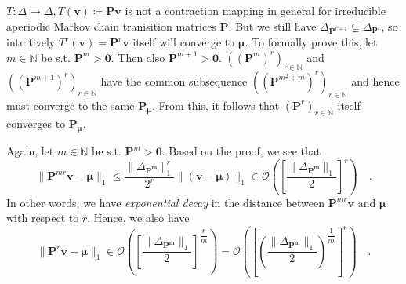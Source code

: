 \documentclass[../../main.tex]{subfiles}
\begin{document}
\begin{remark}
    $T: \Delta \to \Delta, T(\bm{v}) \coloneqq \bm{Pv}$ is not a contraction mapping in general for irreducible aperiodic Markov chain tranisition matrices $\bm{P}$. But we still have $\Delta_{\bm{P}^{r+1}} \subsetneq \Delta_{\bm{P}^{r}}$, so intuitively $T^{r}(\bm{v}) = \bm{P}^r\bm{v}$ itself will converge to $\bm{\mu}$. To formally prove this, let $m \in \mathbb{N}$ be s.t. $\bm{P}^m > \bm{0}$. Then also $\bm{P}^{m + 1} > \bm{0}$. $((\bm{P}^m)^r)_{r \in \mathbb{N}}$ and $((\bm{P}^{m + 1})^r)_{r \in \mathbb{N}}$ have the common subsequence $((\bm{P}^{m^2 + m})^r)_{r \in \mathbb{N}}$ and hence must converge to the same $\bm{P_\mu}$. From this, it follows that $(\bm{P}^r)_{r \in \mathbb{N}}$ itself converges to $\bm{P_\mu}$.
\end{remark}

\begin{remark}
    Again, let $m \in \mathbb{N}$ be s.t. $\bm{P}^m > \bm{0}$. Based on the proof, we see that
    \[
        \| \bm{P}^{mr} \bm{v} - \bm{\mu} \|_1 \leq \dfrac{\|\Delta_{\bm{P^m}}\|_1^r}{2^r} \| (\bm{v} - \bm{\mu}) \|_1 \in \mathcal{O} \left( \left[ \frac{\|\Delta_{\bm{P^m}}\|_1}{2} \right] ^r \right) \quad .
    \]
    In other words, we have \emph{exponential decay} in the distance between $\bm{P}^{mr} \bm{v}$ and $\bm{\mu}$ with respect to $r$. Hence, we also have
    \[
        \| \bm{P}^{r} \bm{v} - \bm{\mu} \|_1 \in \mathcal{O} \left( \left[ \frac{\|\Delta_{\bm{P^m}}\|_1}{2} \right] ^{\dfrac{r}{m}} \right) = 
        \mathcal{O} \left( \left[ \left( \frac{\|\Delta_{\bm{P^m}}\|_1}{2} \right) ^{\dfrac{1}{m}} \right] ^r \right) \quad .
    \]
\end{remark}
\end{document}
